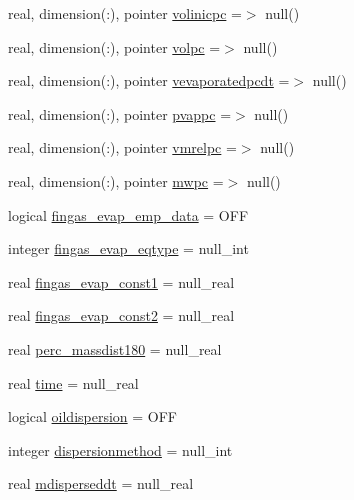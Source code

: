 \begin{DoxyCompactItemize}
\item 
real, dimension(\+:), pointer \mbox{\hyperlink{structmoduleoil__0d_1_1t__var_a66f26411e5e4a94d53d38c8bbca945d4}{volinicpc}} =$>$ null()
\item 
real, dimension(\+:), pointer \mbox{\hyperlink{structmoduleoil__0d_1_1t__var_a025e42b43f4f72408693a5e6f64251e0}{volpc}} =$>$ null()
\item 
real, dimension(\+:), pointer \mbox{\hyperlink{structmoduleoil__0d_1_1t__var_aa8c632a027c83aadb6042fe20b38a68f}{vevaporatedpcdt}} =$>$ null()
\item 
real, dimension(\+:), pointer \mbox{\hyperlink{structmoduleoil__0d_1_1t__var_a6791284b5d44a67c95e61bb8619ac01c}{pvappc}} =$>$ null()
\item 
real, dimension(\+:), pointer \mbox{\hyperlink{structmoduleoil__0d_1_1t__var_ae49115ba9a4d24caa441daa076b71562}{vmrelpc}} =$>$ null()
\item 
real, dimension(\+:), pointer \mbox{\hyperlink{structmoduleoil__0d_1_1t__var_ae208de6768b40692e4e0eb7602adf280}{mwpc}} =$>$ null()
\item 
logical \mbox{\hyperlink{structmoduleoil__0d_1_1t__var_a78770884c4097043938b691ecc57f586}{fingas\+\_\+evap\+\_\+emp\+\_\+data}} = O\+FF
\item 
integer \mbox{\hyperlink{structmoduleoil__0d_1_1t__var_a5d7a10120cbbe351abddc03c73a622d5}{fingas\+\_\+evap\+\_\+eqtype}} = null\+\_\+int
\item 
real \mbox{\hyperlink{structmoduleoil__0d_1_1t__var_a29ffdbe8e919224fa68c87b8d11cbf3a}{fingas\+\_\+evap\+\_\+const1}} = null\+\_\+real
\item 
real \mbox{\hyperlink{structmoduleoil__0d_1_1t__var_ac315ca5399bc3facf1c00f638c692f39}{fingas\+\_\+evap\+\_\+const2}} = null\+\_\+real
\item 
real \mbox{\hyperlink{structmoduleoil__0d_1_1t__var_a6bb198785c4b9ec2e035c3f39e6e932a}{perc\+\_\+massdist180}} = null\+\_\+real
\item 
real \mbox{\hyperlink{structmoduleoil__0d_1_1t__var_a771d2314709831d9242909cad11add40}{time}} = null\+\_\+real
\item 
logical \mbox{\hyperlink{structmoduleoil__0d_1_1t__var_a3e94cfe36342f39083153e12ea52bf91}{oildispersion}} = O\+FF
\item 
integer \mbox{\hyperlink{structmoduleoil__0d_1_1t__var_ab1ffbb1a171af262a35210def8999526}{dispersionmethod}} = null\+\_\+int
\item 
real \mbox{\hyperlink{structmoduleoil__0d_1_1t__var_a972db3d8397b170a161c0099cc5b29e1}{mdisperseddt}} = null\+\_\+real

\end{DoxyCompactItemize}
